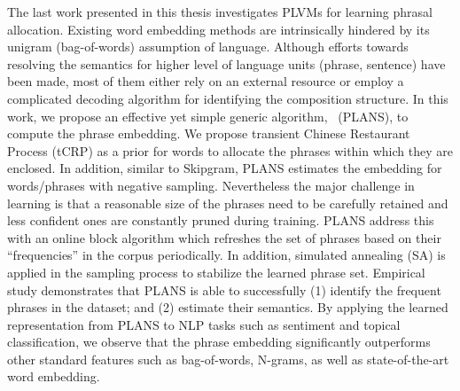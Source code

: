 The last work presented in this thesis investigates PLVMs for learning phrasal
allocation. Existing word embedding methods are intrinsically hindered by its
unigram (bag-of-words) assumption of language. Although efforts towards
resolving the semantics for higher level of language units (\eg phrase,
sentence) have been made, most of them either rely on an external resource or
employ a complicated decoding algorithm for identifying the composition
structure. In this work, we propose an effective yet simple generic algorithm,
\PLANS{}~(PLANS), to compute the phrase embedding. We propose transient Chinese
Restaurant Process (tCRP) as a prior for words to allocate the phrases within
which they are enclosed. In addition, similar to Skipgram, PLANS estimates the
embedding for words/phrases with negative sampling.  Nevertheless the major
challenge in learning is that a reasonable size of the phrases need to be
carefully retained and less confident ones are constantly pruned during
training. PLANS address this with an online block algorithm which refreshes the
set of phrases based on their ``frequencies'' in the corpus periodically. In
addition, simulated annealing (SA) is applied in the sampling process to
stabilize the learned phrase set. Empirical study demonstrates that PLANS is
able to successfully (1) identify the frequent phrases in the dataset; and (2)
estimate their semantics. By applying the learned representation from PLANS to
NLP tasks such as sentiment and topical classification, we observe that the
phrase embedding significantly outperforms other standard features such as
bag-of-words, N-grams, as well as state-of-the-art word embedding.
